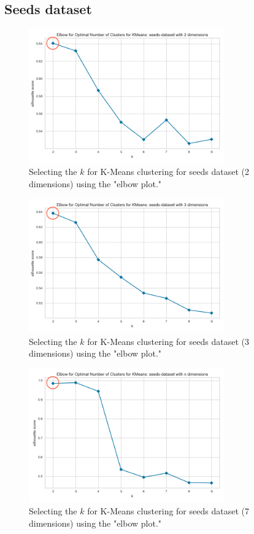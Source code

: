 \subsection{Seeds dataset}
\begin{figure}[H]
  \includegraphics[width=0.75\textwidth]{Appendix//parameter-selection/seeds-dataset-2-kmeans.png}
  \caption{Selecting the $k$ for K-Means clustering for seeds dataset (2 dimensions) using the "elbow plot."}
  \label{hyperparameters:agglomerative-seeds-dataset-2d}
\end{figure}
\begin{figure}[H]
  \includegraphics[width=0.75\textwidth]{Appendix//parameter-selection/seeds-dataset-3-kmeans.png}
  \caption{Selecting the $k$ for K-Means clustering for seeds dataset (3 dimensions) using the "elbow plot."}
  \label{hyperparameters:agglomerative-seeds-dataset-3d}
\end{figure}
\begin{figure}[H]
  \includegraphics[width=0.75\textwidth]{Appendix//parameter-selection/seeds-dataset-n-kmeans.png}
  \caption{Selecting the $k$ for K-Means clustering for seeds dataset (7 dimensions) using the "elbow plot."}
  \label{hyperparameters:agglomerative-seeds-dataset-7d}
\end{figure}
\newpage

